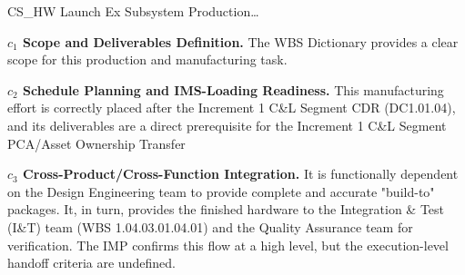\begin{frame}{CS\_HW Launch Ex Subsystem Production\ldots{}}
\begin{minipage}{0.90\textwidth}
\raggedright
\fontsize{8}{9.5}\selectfont
\textbf{\(c_1\) Scope and Deliverables Definition.}
The WBS Dictionary provides a clear scope for this production and manufacturing task.\par\vspace{0.6em}
\textbf{\(c_2\) Schedule Planning and IMS-Loading Readiness.}
This manufacturing effort is correctly placed after the Increment 1 C\&L Segment CDR (DC1.01.04), and its deliverables are a direct prerequisite for the Increment 1 C\&L Segment PCA/Asset Ownership Transfer\par\vspace{0.6em}
\textbf{\(c_3\) Cross-Product/Cross-Function Integration.}
It is functionally dependent on the Design Engineering team to provide complete and accurate "build-to" packages. It, in turn, provides the finished hardware to the Integration \& Test (I\&T) team (WBS 1.04.03.01.04.01) and the Quality Assurance team for verification. The IMP confirms this flow at a high level, but the execution-level handoff criteria are undefined.\par\vspace{0.6em}
\end{minipage}
\end{frame}

\endinput
